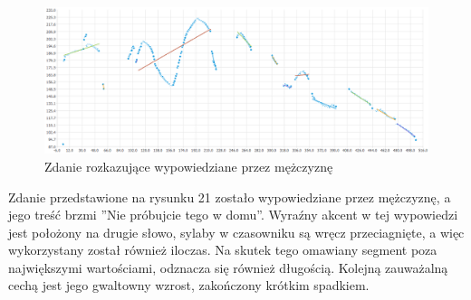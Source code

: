 \documentclass[a4paper,12 pt]{report}
\begin{document}
 \FloatBarrier
\begin{figure}[h]
\centering
\includegraphics[scale=0.6]{rozkaz_dom.png}
\caption{Zdanie rozkazujące wypowiedziane przez mężczyznę}
\end{figure}
\FloatBarrier
Zdanie przedstawione na rysunku 21 zostało wypowiedziane przez mężczyznę, a jego treść brzmi ''Nie próbujcie tego w domu''. Wyraźny akcent w tej wypowiedzi jest położony na drugie słowo, sylaby w czasowniku są wręcz przeciagnięte, a więc wykorzystany został również iloczas. Na skutek tego omawiany segment poza największymi wartościami, odznacza się również długością. Kolejną zauważalną cechą jest jego gwaltowny wzrost, zakończony krótkim spadkiem. 
\end{document}
